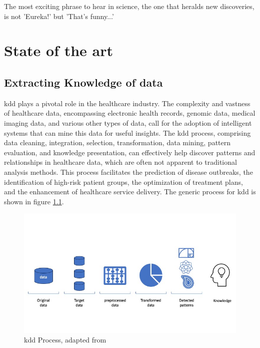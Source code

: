 \begin{savequote}[75mm]
The most exciting phrase to hear in science, the one that heralds new discoveries, is not 'Eureka!' but 'That's funny...'
\end{savequote}

\chapter{State of the art} \label{chap:sota}

\section{Extracting Knowledge of data}\label{sec:kdd}

\cite{Fayyad_Piatetsky-Shapiro_Smyth_1996}
\ac{kdd} plays a pivotal role in the healthcare industry. The complexity and vastness of healthcare data, encompassing electronic health records, genomic data, medical imaging data, and various other types of data, call for the adoption of intelligent systems that can mine this data for useful insights. The \ac{kdd} process, comprising data cleaning, integration, selection, transformation, data mining, pattern evaluation, and knowledge presentation, can effectively help discover patterns and relationships in healthcare data, which are often not apparent to traditional analysis methods. This process facilitates the prediction of disease outbreaks, the identification of high-risk patient groups, the optimization of treatment plans, and the enhancement of healthcare service delivery. The generic process for \ac{kdd} is shown in figure \ref{fig:kdd-generic}.

\begin{figure}
\centering
\includegraphics[scale=0.55]{figures/imagens-tese.jpg}

\caption{\ac{kdd} Process, adapted from \cite{Fayyad_Piatetsky-Shapiro_Smyth_1996}} \label{fig:kdd-generic}
\end{figure}

